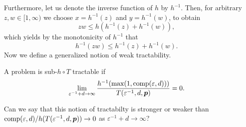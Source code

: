 \documentclass[11pt,a4paper]{article}
\newcommand{\fred}[1]{\begingroup\color{blue}#1\endgroup}
\begin{document}
Furthermore, let us denote the inverse function of $h$ by $h^{-1}$. 
Then, for arbitrary $z,w \in [1,\infty)$ we choose $x=h^{-1}(z)$ and $y=h^{-1}(w)$, to obtain
\[
z w \le h (h^{-1}(z)+h^{-1}(w)),
\]
which yields by the monotonicity of $h^{-1}$ that
\begin{equation}\label{eq:submult_h_inverse}
h^{-1}(z w) \le h^{-1}(z)+h^{-1}(w).
\end{equation}
Now we define a generalized notion of weak tractability.
\begin{definition} \label{def:subhT}
	A problem is sub-$h \circ T$ tractable if
	\begin{equation*}
		\lim_{\varepsilon^{-1} + d \to \infty} \frac{h^{-1}(\max(1,\operatorname{comp}(\varepsilon,d)))}{T(\varepsilon^{-1},d,\boldsymbol{p})} = 0.
	\end{equation*}
\end{definition}

\fred{Can we say that this notion of tractabilty is stronger or weaker than $\operatorname{comp}(\varepsilon,d)/h(T(\varepsilon^{-1},d,\boldsymbol{p})) \to 0$ as $\varepsilon^{-1} + d \to \infty$?}
\end{document}
